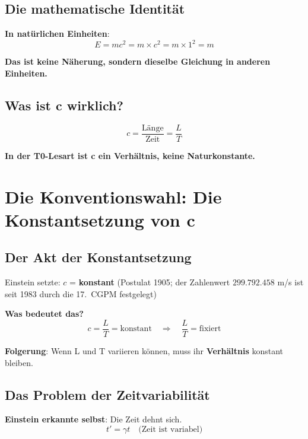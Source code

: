 	\subsection{Die mathematische Identität}
	
	\textbf{In natürlichen Einheiten}:
	\begin{equation}
		E = mc^2 = m \times c^2 = m \times 1^2 = m
	\end{equation}
	
	\textbf{Das ist keine Näherung, sondern dieselbe Gleichung in anderen Einheiten.}
	
	\subsection{Was ist c wirklich?}
	
	\begin{equation}
		c = \frac{\text{Länge}}{\text{Zeit}} = \frac{L}{T}
	\end{equation}
	
	\textbf{In der T0-Lesart ist c ein Verhältnis, keine Naturkonstante.}
	
	\section{Die Konventionswahl: Die Konstantsetzung von c}
	
	\subsection{Der Akt der Konstantsetzung}
	
	Einstein setzte: $c$ = \textbf{konstant} (Postulat 1905; der Zahlenwert $299.792.458$ m/s ist seit 1983 durch die 17.~CGPM festgelegt)
	
	\textbf{Was bedeutet das?}
	\begin{equation}
		c = \frac{L}{T} = \text{konstant} \quad \Rightarrow \quad \frac{L}{T} = \text{fixiert}
	\end{equation}
	
	\textbf{Folgerung}: Wenn L und T variieren können, muss ihr \textbf{Verhältnis} konstant bleiben.
	
	\subsection{Das Problem der Zeitvariabilität}
	
	\textbf{Einstein erkannte selbst}: Die Zeit dehnt sich.
	\begin{equation}
		t' = \gamma t \quad \text{(Zeit ist variabel)}
	\end{equation}
	
